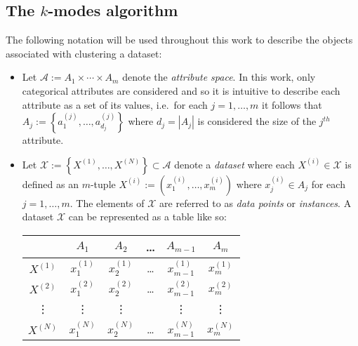 \subsection{The \(k\)-modes algorithm}\label{subsec:kmodes}

The following notation will be used throughout this work to describe the objects
associated with clustering a dataset:

\begin{itemize}
    \item Let \(\mathcal{A} := A_1 \times \cdots \times A_m\) denote the
        \emph{attribute space}. In this work, only categorical attributes are
        considered and so it is intuitive to describe each attribute as a set of
        its values, i.e.\ for each \(j = 1, \ldots, m\) it follows that \(A_j :=
        \left\{a_1^{(j)}, \ldots, a_{d_j}^{(j)}\right\}\) where \(d_j = |A_j|\)
        is considered the size of the \(j^{th}\) attribute.

    \item Let \(\mathcal{X} := \left\{X^{(1)}, \ldots, X^{(N)}\right\} \subset
        \mathcal{A}\) denote a \emph{dataset} where each \(X^{(i)} \in
        \mathcal{X}\) is defined as an \(m\)-tuple \(X^{(i)} := \left(x_1^{(i)},
        \ldots, x_m^{(i)}\right)\) where \(x_j^{(i)} \in A_j\) for each \(j = 1,
        \ldots, m\). The elements of \(\mathcal{X}\) are referred to as
        \emph{data points} or \emph{instances}. A dataset \(\mathcal{X}\) can be
        represented as a table like so:
        \begin{table}[H]
        \centering
        \begin{tabular}{cccccc}
            {} & \(A_1\) & \(A_2\) & \quad \ldots \quad & \(A_{m-1}\) & \(A_m\)
            \\
            \midrule
            \(X^{(1)}\) & \(x_1^{(1)}\) & \(x_2^{(1)}\) & \quad \ldots \quad & 
            \(x_{m-1}^{(1)}\) & \(x_m^{(1)}\)
            \\
            \(X^{(2)}\) & \(x_1^{(2)}\) & \(x_2^{(2)}\) & \quad \ldots \quad &
            \(x_{m-1}^{(2)}\) & \(x_m^{(2)}\)
            \\
            \vdots & \vdots & \vdots & {} & \vdots & \vdots
            \\
            \(X^{(N)}\) & \(x_1^{(N)}\) & \(x_2^{(N)}\) & \quad \ldots \quad &
            \(x_{m-1}^{(N)}\) & \(x_m^{(N)}\)
        \end{tabular}
        \end{table}


\end{itemize}
